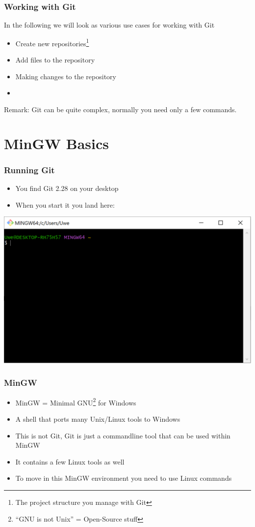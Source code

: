 \documentclass[12pt,english]{beamer}
\begin{document}
\begin{frame}
\frametitle{Working with Git}

In the following we will look as various use cases for working with Git

\begin{itemize}
\item Create new repositories\footnote{The project structure you manage with Git}
\item Add files to the repository
\item Making changes to the repository
\item 
\end{itemize}

Remark: Git can be quite complex, normally you need only a few commands.

\end{frame}

\section{MinGW Basics}

\begin{frame}
\frametitle{Running Git}

\begin{itemize}
\item You find Git 2.28 on your desktop
\item When you start it you land here:
\end{itemize}

\includegraphics[width=\textwidth]{mingw-01}
\end{frame}
 
\begin{frame}
\frametitle{MinGW}

\begin{itemize}
\item MinGW = Minimal GNU\footnote{\enquote{GNU is not Unix} = Open-Source stuff} for Windows
\item A shell that ports many Unix/Linux tools to Windows
\item This is not Git, Git is just a commandline tool that can be used within MinGW
\item It contains a few Linux tools as well
\item To move in this MinGW environment you need to use Linux commands
\end{itemize}
\end{frame}
\end{document}
